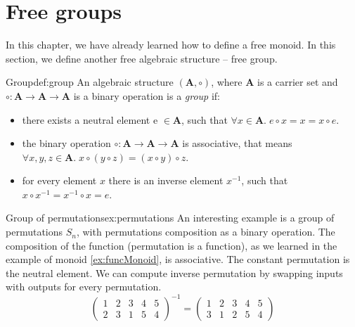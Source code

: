 \section{Free groups}
In this chapter, we have already learned how to define a free monoid. In this section, we define another free algebraic structure -- free group.
\begin{defi}{Group}{def:group}
An algebraic structure $(\mathbf{A}, \circ)$, where $\mathbf{A}$ is a carrier set and $\circ: \mathbf{A} \rightarrow  \mathbf{A} \rightarrow \mathbf{A}$ is a binary operation is a \emph{group} \cite{AbstractAlgebra} if:
\begin{itemize}
    \itemsep 0em 
    \item there exists a neutral element e $\in \mathbf{A}$, such that $\forall x \in \mathbf{A}. \; e \circ x = x = x \circ e$.
    \item the binary operation $\circ: \mathbf{A} \rightarrow \mathbf{A} \rightarrow \mathbf{A}$ is associative, that means $\forall x, y, z \in \mathbf{A}. \; x \circ (y \circ z) = (x \circ y) \circ z$.
    \item for every element $x$ there is an inverse element $x^{-1}$, such that $x \circ x^{-1} = x^{-1} \circ x = e$.
\end{itemize}
\end{defi}
\begin{example}{Group of permutations}{ex:permutations}
An interesting example is a group of permutations $S_n$, with permutations composition as a binary operation. The composition of the function (permutation is a function), as we learned in the example of monoid \ref{ex:funcMonoid}, is associative. The constant permutation is the neutral element. We can compute inverse permutation by swapping inputs with outputs for every permutation.
$$
\begin{pmatrix}
    1 & 2 & 3 & 4 & 5 \\
    2 & 3 & 1 & 5 & 4
\end{pmatrix}^{-1}
=
\begin{pmatrix}
    1 & 2 & 3 & 4 & 5 \\
    3 & 1 & 2 & 5 & 4
\end{pmatrix}
$$
\end{example}
